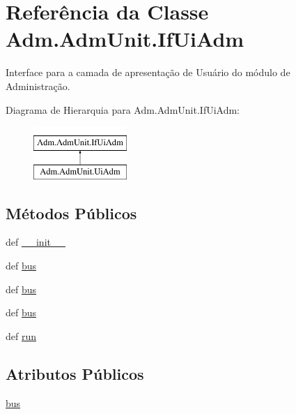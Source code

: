 \hypertarget{classAdm_1_1AdmUnit_1_1IfUiAdm}{\section{Referência da Classe Adm.\-Adm\-Unit.\-If\-Ui\-Adm}
\label{classAdm_1_1AdmUnit_1_1IfUiAdm}
}


Interface para a camada de apresentação de Usuário do módulo de Administração.  


Diagrama de Hierarquia para Adm.\-Adm\-Unit.\-If\-Ui\-Adm\-:\begin{figure}[H]
\begin{center}
\leavevmode
\includegraphics[height=2.000000cm]{d7/d07/classAdm_1_1AdmUnit_1_1IfUiAdm}
\end{center}
\end{figure}
\subsection*{Métodos Públicos}
\begin{DoxyCompactItemize}
\item 
def \hyperlink{classAdm_1_1AdmUnit_1_1IfUiAdm_ab37924016cd115531c85439dc82f5ea3}{\-\_\-\-\_\-init\-\_\-\-\_\-}
\item 
def \hyperlink{classAdm_1_1AdmUnit_1_1IfUiAdm_a4863c3ebab6e5fac647ab32415153470}{bus}
\item 
def \hyperlink{classAdm_1_1AdmUnit_1_1IfUiAdm_a4863c3ebab6e5fac647ab32415153470}{bus}
\item 
def \hyperlink{classAdm_1_1AdmUnit_1_1IfUiAdm_a4863c3ebab6e5fac647ab32415153470}{bus}
\item 
def \hyperlink{classAdm_1_1AdmUnit_1_1IfUiAdm_ad2879ed80544aa2a153c7eeed3a09a52}{run}
\end{DoxyCompactItemize}
\subsection*{Atributos Públicos}
\begin{DoxyCompactItemize}
\item 
\hyperlink{classAdm_1_1AdmUnit_1_1IfUiAdm_a604bb1c41014e85eee44db64a79a7fcc}{bus}
\end{DoxyCompactItemize}


